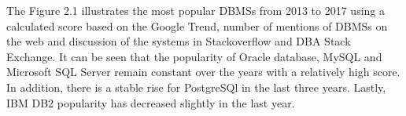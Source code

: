 The Figure 2.1 illustrates the most popular DBMSs from 2013 to 2017 using a calculated score based on the Google Trend, number of mentions of DBMSs on the web and discussion of the systems in Stackoverflow and DBA Stack Exchange. It can be seen that the popularity of Oracle database, MySQL and Microsoft SQL Server remain constant over the years with a relatively high score. In addition, there is a stable rise for PostgreSQl in the last three years. Lastly, IBM DB2 popularity has decreased slightly in the last year. 



